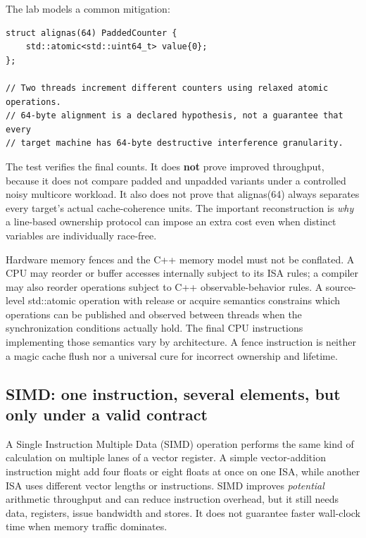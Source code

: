 The lab models a common mitigation:

\begin{verbatim}
struct alignas(64) PaddedCounter {
    std::atomic<std::uint64_t> value{0};
};

// Two threads increment different counters using relaxed atomic operations.
// 64-byte alignment is a declared hypothesis, not a guarantee that every
// target machine has 64-byte destructive interference granularity.
\end{verbatim}

The test verifies the final counts. It does \textbf{not} prove improved throughput, because it does not compare padded and unpadded variants under a controlled noisy multicore workload. It also does not prove that alignas(64) always separates every target's actual cache-coherence units. The important reconstruction is \emph{why} a line-based ownership protocol can impose an extra cost even when distinct variables are individually race-free.

Hardware memory fences and the C++ memory model must not be conflated. A CPU may reorder or buffer accesses internally subject to its ISA rules; a compiler may also reorder operations subject to C++ observable-behavior rules. A source-level std::atomic operation with release or acquire semantics constrains which operations can be published and observed between threads when the synchronization conditions actually hold. The final CPU instructions implementing those semantics vary by architecture. A fence instruction is neither a magic cache flush nor a universal cure for incorrect ownership and lifetime.

\subsection{SIMD: one instruction, several elements, but only under a valid contract}\label{01-foundations-i-ch007-simd-one-instruction-several-elements-but-only-under-a-valid-contract}

A Single Instruction Multiple Data (SIMD) operation performs the same kind of calculation on multiple lanes of a vector register. A simple vector-addition instruction might add four floats or eight floats at once on one ISA, while another ISA uses different vector lengths or instructions. SIMD improves \emph{potential} arithmetic throughput and can reduce instruction overhead, but it still needs data, registers, issue bandwidth and stores. It does not guarantee faster wall-clock time when memory traffic dominates.

